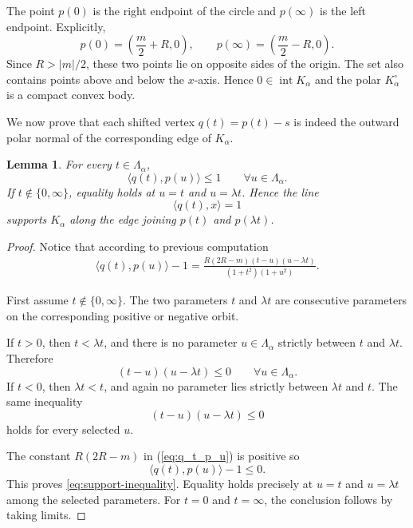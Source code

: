\documentclass[12pt]{article}
\newtheorem{lemma}[theorem]{Lemma}
\theoremstyle{remark}
\newcommand{\intt}{\operatorname{int}}
\begin{document}
The point $p(0)$ is the right endpoint of the circle and $p(\infty)$ is the left endpoint.  Explicitly,
\[
        p(0)=\left(\frac m2+R,0\right),
        \qquad
        p(\infty)=\left(\frac m2-R,0\right).
\]
Since $R>|m|/2$, these two points lie on opposite sides of the origin.  The set also contains points above and below the $x$-axis. Hence $0\in \intt K_\alpha$ and the polar $K_\alpha^\circ$ is a compact convex body.


We now prove that each shifted vertex $q(t)=p(t)-s$
is indeed the outward polar normal of the corresponding edge of $K_\alpha$.

\begin{lemma}\label{lem:supporting-halfplanes}
For every $t\in\Lambda_\alpha$,
\begin{equation}\label{eq:support-inequality}
        \langle q(t), p(u) \rangle \le 1
        \qquad\forall u\in\Lambda_\alpha.
\end{equation}
If $t\notin\{0,\infty\}$, equality holds at $u=t$ and $u=\lambda t$.  Hence the line
\[
        \langle q(t), x \rangle =1
\]
supports $K_\alpha$ along the edge joining $p(t)$ and $p(\lambda t)$.
\end{lemma}
\begin{proof}
Notice that according to previous computation
\begin{align} \label{eq:q_t_p_u}
\langle q(t), p(u) \rangle -1 = \frac{R(2R-m)(t-u)(u - \lambda t)}{(1+t^2)(1+u^2)}.
\end{align}

First assume $t\notin\{0,\infty\}$.  The two parameters $t$ and $\lambda t$ are consecutive parameters on the corresponding positive or negative orbit.

If $t>0$, then $t<\lambda t$, and there is no parameter $u\in\Lambda_\alpha$ strictly between $t$ and $\lambda t$.  Therefore
\[
        (t-u)(u-\lambda t)\le 0
        \qquad\forall u\in\Lambda_\alpha.
\]
If $t<0$, then $\lambda t<t$, and again no parameter lies strictly between $\lambda t$ and $t$.  The same inequality
\[
        (t-u)(u-\lambda t)\le 0
\]
holds for every selected $u$.

The constant $R(2R - m)$ in (\ref{eq:q_t_p_u}) is positive so
\[
        \langle q(t), p(u)\rangle - 1\le 0.
\]
This proves \eqref{eq:support-inequality}.  Equality holds precisely at $u=t$ and $u=\lambda t$ among the selected parameters.
For $t=0$ and $t=\infty$, the conclusion follows by taking limits.
\end{proof}
\end{document}
